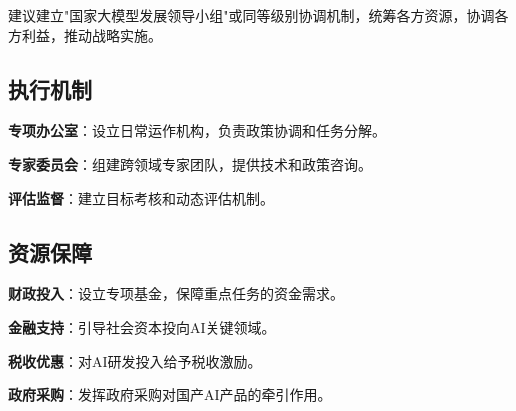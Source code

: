 建议建立"国家大模型发展领导小组"或同等级别协调机制，统筹各方资源，协调各方利益，推动战略实施。

\subsection{执行机制}

\textbf{专项办公室}：设立日常运作机构，负责政策协调和任务分解。

\textbf{专家委员会}：组建跨领域专家团队，提供技术和政策咨询。

\textbf{评估监督}：建立目标考核和动态评估机制。

\subsection{资源保障}

\textbf{财政投入}：设立专项基金，保障重点任务的资金需求。

\textbf{金融支持}：引导社会资本投向AI关键领域。

\textbf{税收优惠}：对AI研发投入给予税收激励。

\textbf{政府采购}：发挥政府采购对国产AI产品的牵引作用。
